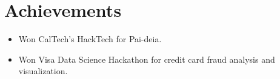 \newcommand\textlcsc[1]{\textsc{\MakeTextLowercase{#1}}}
\section{Achievements}
\begin{itemize}
\item Won CalTech's HackTech for Pai-deia.
\item Won Visa Data Science Hackathon for credit card fraud analysis and visualization.
\end{itemize}
